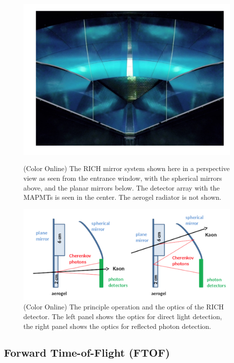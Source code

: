 \documentclass[final,3p,twocolumn]{elsarticle}
\begin{document}
\begin{figure}[t!]
\centerline{\includegraphics[width=1.0\columnwidth]{rich-mirrors.png}}
\caption{(Color Online) The RICH mirror system shown here in a perspective view as seen from the entrance 
window, with the spherical mirrors above, and
the planar mirrors below. The detector array with the MAPMTs is seen in the center. The aerogel radiator is not shown. }
\label{RICH}
\includegraphics[width=1.0\columnwidth]{rich.png}
\caption{(Color Online) The principle operation and the optics of the
RICH detector. The left panel shows the optics for direct light detection, the right panel shows the optics for reflected photon detection.}
\label{RICH-optics}
\end{figure}

\subsection{Forward Time-of-Flight (FTOF)}
\label{ftof}
\end{document}
